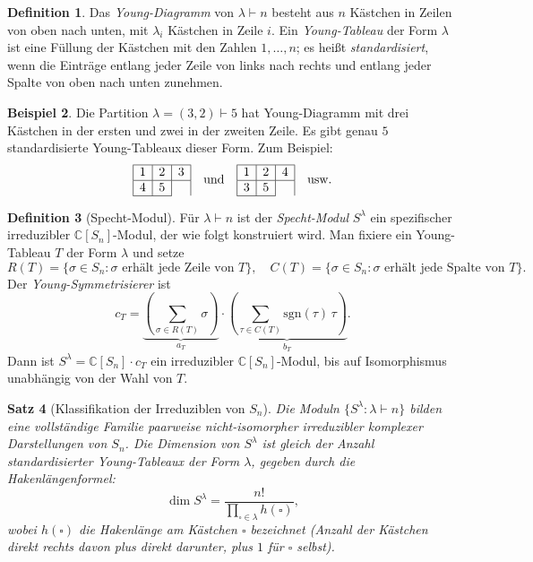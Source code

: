 \documentclass[12pt,a4paper]{amsart}
\newtheorem{theorem}{Satz}[section]
\theoremstyle{definition}
\newtheorem{definition}[theorem]{Definition}
\newtheorem{beispiel}[theorem]{Beispiel}
\begin{document}
\begin{definition}
Das \emph{Young-Diagramm} von $\lambda \vdash n$ besteht aus $n$ Kästchen in
Zeilen von oben nach unten, mit $\lambda_i$ Kästchen in Zeile $i$.  Ein
\emph{Young-Tableau} der Form $\lambda$ ist eine Füllung der Kästchen mit den
Zahlen $1,\ldots,n$; es heißt \emph{standardisiert}, wenn die Einträge entlang
jeder Zeile von links nach rechts und entlang jeder Spalte von oben nach unten
zunehmen.
\end{definition}

\begin{beispiel}
Die Partition $\lambda = (3,2) \vdash 5$ hat Young-Diagramm mit drei Kästchen in
der ersten und zwei in der zweiten Zeile.  Es gibt genau $5$ standardisierte
Young-Tableaux dieser Form.  Zum Beispiel:
\[
\begin{array}{|c|c|c|}
\hline
1 & 2 & 3 \\
\hline
4 & 5 & \\
\cline{1-2}
\end{array}
\quad\text{und}\quad
\begin{array}{|c|c|c|}
\hline
1 & 2 & 4 \\
\hline
3 & 5 & \\
\cline{1-2}
\end{array}
\quad\text{usw.}
\]
\end{beispiel}

\begin{definition}[Specht-Modul]
Für $\lambda \vdash n$ ist der \emph{Specht-Modul} $S^\lambda$ ein spezifischer
irreduzibler $\mathbb{C}[S_n]$-Modul, der wie folgt konstruiert wird.  Man fixiere
ein Young-Tableau $T$ der Form $\lambda$ und setze
\[
    R(T) = \{\sigma \in S_n : \sigma \text{ erhält jede Zeile von } T\},
\quad
    C(T) = \{\sigma \in S_n : \sigma \text{ erhält jede Spalte von } T\}.
\]
Der \emph{Young-Symmetrisierer} ist
\[
    c_T = \underbrace{\left(\sum_{\sigma \in R(T)} \sigma\right)}_{a_T} \cdot
          \underbrace{\left(\sum_{\tau \in C(T)} \mathrm{sgn}(\tau)\,\tau\right)}_{b_T}.
\]
Dann ist $S^\lambda = \mathbb{C}[S_n] \cdot c_T$ ein irreduzibler
$\mathbb{C}[S_n]$-Modul, bis auf Isomorphismus unabhängig von der Wahl von $T$.
\end{definition}

\begin{theorem}[Klassifikation der Irreduziblen von $S_n$]
\label{satz:sn_klass}
Die Moduln $\{S^\lambda : \lambda \vdash n\}$ bilden eine vollständige Familie
paarweise nicht-isomorpher irreduzibler komplexer Darstellungen von $S_n$.  Die
Dimension von $S^\lambda$ ist gleich der Anzahl standardisierter Young-Tableaux
der Form $\lambda$, gegeben durch die \emph{Hakenlängenformel}:
\[
    \dim S^\lambda = \frac{n!}{\prod_{\square \in \lambda} h(\square)},
\]
wobei $h(\square)$ die \emph{Hakenlänge} am Kästchen $\square$ bezeichnet
(Anzahl der Kästchen direkt rechts davon plus direkt darunter, plus $1$ für
$\square$ selbst).
\end{theorem}
\end{document}
